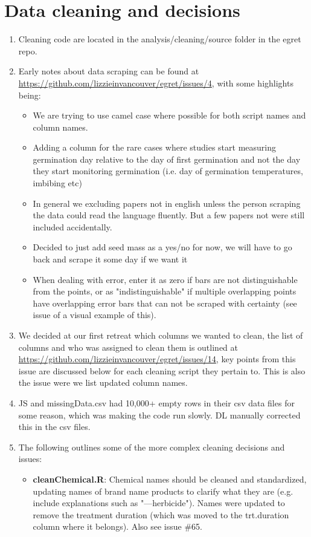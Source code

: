 \documentclass{article}[12pt]
\begin{document}
\section*{Data cleaning and decisions}
\begin{enumerate}
\item Cleaning code are located in the analysis/cleaning/source folder in the egret repo.
\item Early notes about data scraping can be found at \url{https://github.com/lizzieinvancouver/egret/issues/4}, with some highlights being:
\begin{itemize}
\item We are trying to use camel case where possible for both script names and column names. 
\item Adding a column for the rare cases where studies start measuring germination day relative to the day of first germination and not the day they start monitoring germination (i.e. day of germination temperatures, imbibing etc)
\item In general we excluding papers not in english unless the person scraping the data could read the language fluently. But a few papers not were still included accidentally. 
\item Decided to just add seed mass as a yes/no for now, we will have to go back and scrape it some day if we want it
\item When dealing with error, enter it as zero if bars are not distinguishable from the points, or as "indistinguishable" if multiple overlapping points have overlapping error bars that can not be scraped with certainty (see issue of a visual example of this).
\end{itemize}
\item We decided at our first retreat which columns we wanted to clean, the list of columns and who was assigned to clean them is outlined at \url{https://github.com/lizzieinvancouver/egret/issues/14}, key points from this issue are discussed below for each cleaning script they pertain to. This is also the issue were we list updated column names.
\item JS and missingData.csv had 10,000+ empty rows in their csv data files for some reason, which was making the code run slowly. DL manually corrected this in the csv files.
\item The following outlines some of the more complex cleaning decisions and issues:
\begin{itemize}
\item \textbf{cleanChemical.R}: Chemical names should be cleaned and standardized, updating names of brand name products to clarify what they are (e.g. include explanations such as "---herbicide"). Names were updated to remove the treatment duration (which was moved to the trt.duration column where it belongs). Also see issue \#65.

\end{itemize}
\end{enumerate}
\end{document}
